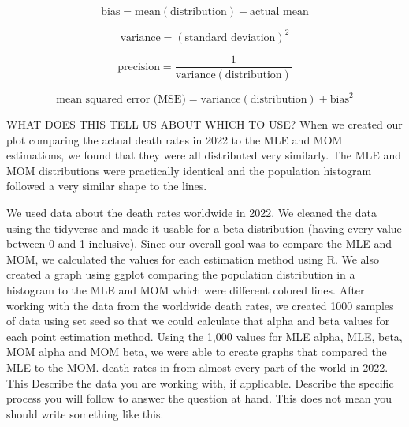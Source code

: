 \documentclass{article}\usepackage[]{graphicx}\usepackage[]{xcolor}
\begin{document}
\begin{multicols}{2}
\[
\text{bias} = \text{mean}(\text{distribution}) - \text{actual mean}
\]

\[
\text{variance} = (\text{standard deviation})^2
\]

\[
\text{precision} = \frac{1}{\text{variance}(\text{distribution})}
\]

\[
\text{mean squared error (MSE)} = \text{variance}(\text{distribution}) + \text{bias}^2
\]

  
  WHAT DOES THIS TELL US ABOUT WHICH TO USE?
  When we created our plot comparing the actual death rates in 2022 to the MLE and MOM estimations, we found that they were all distributed very similarly. The MLE and MOM distributions were practically identical and the population histogram followed a very similar shape to the lines. 



We used data about the death rates worldwide in 2022. We cleaned the data using the tidyverse \citep{tidyverse} 
and made it usable for a beta distribution (having every value between 0 and 1 inclusive). 
Since our overall goal was to compare the MLE and MOM, we calculated the values for each estimation  
method using R. We also created a graph using ggplot \citep{ggplot2} comparing the population distribution in a histogram to the MLE and 
MOM which were different colored lines.
After working with the data from the worldwide death rates, we created 1000 samples of data using set seed 
so that we could calculate that alpha and beta values for each point estimation method. Using the 1,000 
values for MLE alpha, MLE, beta, MOM alpha and MOM beta, we were able to create graphs that compared the MLE 
to the MOM.
death rates in from almost every part of the world in 2022. This 
Describe the data you are working with, if applicable. Describe the specific process you will follow to answer the question at hand. This does not mean you should write something like this.

\vspace{2em}

\begin{tiny}

\end{tiny}
\end{multicols}

\newpage
\onecolumn
\end{document}
